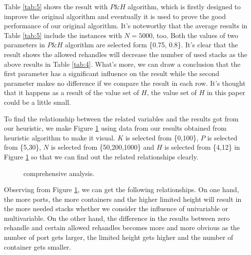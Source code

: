 \documentclass[review,3p,times,authoryear,12pt]{elsarticle}
\begin{document}
Table \ref{tab:5} shows the result with $P\&H$ algorithm, which is firstly designed to improve the original algorithm and eventually it is used to prove the good performance of our original algorithm.
It's noteworthy that the average results in Table \ref{tab:5} include the instances with $N=5000$, too.
Both the values of two parameters in $P\&H$ algorithm are selected form \{0.75, 0.8\}.
It's clear that the result shows the allowed rehandles will decrease the number of used stacks as the above results in Table \ref{tab:4}.
What's more, we can draw a conclusion that the first parameter has a significant influence on the result while the second parameter makes no difference if we compare the result in each row.
It's thought that it happens as a result of the value set of $H$, the value set of $H$ in this paper could be a little small.

To find the relationship between the related variables and the results got from our heuristic, we make Figure \ref{fig 5:graph} using data from our results obtained from heuristic algorithm to make it visual.
$K$ is selected from \{0,100\}, $P$ is selected from \{5,30\}, $N$ is selected from \{50,200,1000\} and $H$ is selected from \{4,12\} in Figure \ref{fig 5:graph} so that we can find out the related relationships clearly.

\begin{figure}[htbp]
\centering
\setlength{\abovecaptionskip}{10pt}
\caption{comprehensive analysis.}
\label{fig 5:graph}
\end{figure}

Observing from Figure \ref{fig 5:graph}, we can get the following relationships.
On one hand, the more ports, the more containers and the higher limited height will result in the more needed stacks whether we consider the influence of univariable or multivariable.
On the other hand, the difference in the results between zero rehandle and certain allowed rehandles becomes more and more obvious as the number of port gets larger, the limited height gets higher and the number of container gets smaller.
\end{document}

